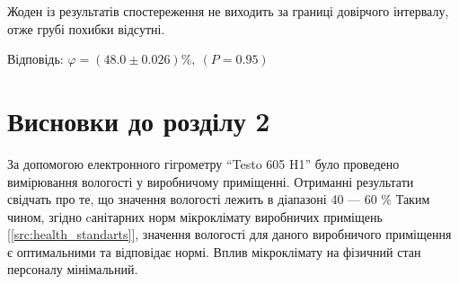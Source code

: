 Жоден із результатів спостереження не виходить за границі довірчого інтервалу, отже грубі похибки відсутні.

Відповідь: $\varphi = (48.0 \pm 0.026)\%,~(P=0.95)$

\newpage
\section*{Висновки до розділу 2}

За допомогою електронного гігрометру ``Testo 605 H1'' було проведено вимірювання вологості у
виробничому приміщенні.  Отриманні результати свідчать про те, що значення вологості лежить в
діапазоні 40 --- 60 \% Таким чином, згідно cанітарних норм мікроклімату виробничих приміщень
[\ref{src:health_standarts}], значення вологості для даного виробничого приміщення є оптимальними та
відповідає нормі.  Вплив мікроклімату на фізичний стан персоналу мінімальний.
